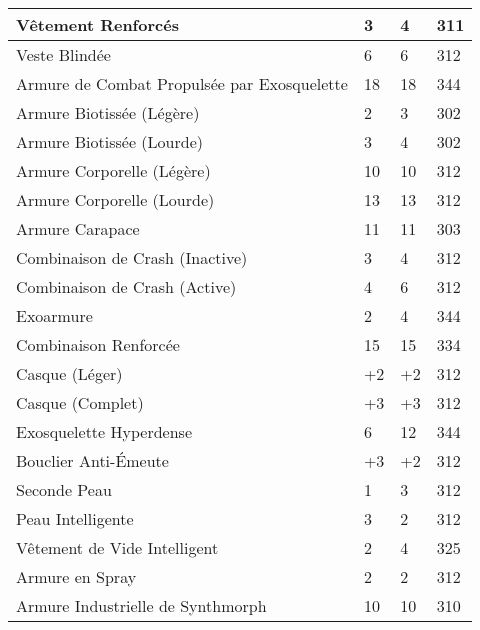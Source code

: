 {{\begin{table}
\begin{tabular}{|l|l|l|l|}
Vêtement Renforcés	&3	&4	&311	\\ \hline

Veste Blindée	&6	&6	&312	\\ \hline

Armure de Combat Propulsée par Exosquelette 	&18	&18	&344	\\ \hline

Armure Biotissée (Légère)	&2	&3	&302	\\ \hline

Armure Biotissée (Lourde)	&3	&4	&302	\\ \hline

Armure Corporelle (Légère)	&10	&10	&312	\\ \hline

Armure Corporelle (Lourde)	&13	&13	&312	\\ \hline

Armure Carapace	&11	&11	&303	\\ \hline

Combinaison de Crash (Inactive)	&3	&4	&312	\\ \hline

Combinaison de Crash (Active)	&4	&6	&312	\\ \hline

Exoarmure	&2	&4	&344	\\ \hline

Combinaison Renforcée	&15	&15	&334	\\ \hline

Casque (Léger)	&+2	&+2	&312	\\ \hline

Casque (Complet)	&+3	&+3	&312	\\ \hline

Exosquelette Hyperdense	&6	&12	&344	\\ \hline

Bouclier Anti-Émeute	&+3	&+2	&312	\\ \hline

Seconde Peau	&1	&3	&312	\\ \hline

Peau Intelligente	&3	&2	&312	\\ \hline

Vêtement de Vide Intelligent	&2	&4	&325	\\ \hline

Armure en Spray	&2	&2	&312	\\ \hline

Armure Industrielle de Synthmorph	&10	&10	&310	\\ \hline


\end{tabular}
\end{table}}}
